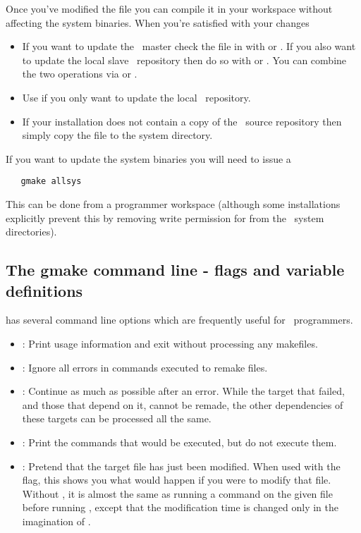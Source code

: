 \noindent
Once you've modified the file you can compile it in your workspace without
affecting the system binaries.  When you're satisfied with your changes

\begin{itemize}
\item
   If you want to update the \aipspp\ master check the file in with
    or .  If you also want to update the local slave
   \rcs\ repository then do so with  or .  You can
   combine the two operations via  or .

\item
   Use  if you only want to update the local \rcs\ repository.

\item
   If your installation does not contain a copy of the \rcs\ source repository
   then simply copy the file to the system directory.
\end{itemize}

\noindent
If you want to update the system binaries you will need to issue a

\begin{verbatim}
   gmake allsys
\end{verbatim}

\noindent
This can be done from a programmer workspace (although some installations
explicitly prevent this by removing write permission for  from
the \aipspp\ system directories).

\subsection*{The gmake command line - flags and variable definitions}

 has several command line options which are frequently useful
for \aipspp\ programmers.

\begin{itemize}
\item
   : Print usage information and exit without processing any
   makefiles.

\item
   : Ignore all  errors  in  commands  executed  to  remake files.

\item
   : Continue as much as possible after an error.   While the target
   that failed, and those that depend on it, cannot be remade, the other
   dependencies of these targets can be processed all the same.

\item
   : Print the commands that would be executed, but do not execute
   them.

\item
   : Pretend that the target file has just been modified.  When used
   with the  flag, this shows you what would happen if you were to
   modify that file.  Without , it is almost the same as running a
    command on the given file before running ,
   except that the modification time is changed only in the imagination of
   .
\end{itemize}

